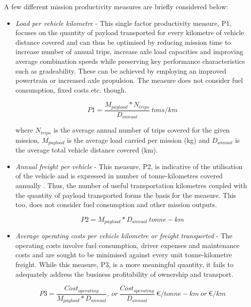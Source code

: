 \documentclass[ExampleMasters.tex]{subfiles}
\begin{document}
		A few different mission productivity measures are briefly considered below:
		\begin{itemize}
			\item \textit{Load per vehicle kilometre} - This single factor productivity measure, P1, focuses on the quantity of payload transported for every kilometre of vehicle distance covered and can thus be optimised by reducing mission time to increase number of annual trips, increase axle load capacities and improving average combination speeds while preserving key performance characteristics such as gradeability. These can be achieved by employing an improved powertrain or increased axle propulsion. The measure does not consider fuel consumption, fixed costs etc. though.

			\begin{equation}
				P1 = \frac{M_{payload}*N_{trips}}{D_{annual}} \ tons/km
			\end{equation}

			where $N_{trips}$ is the average annual number of trips covered for the given mission, $M_{payload}$ is the average load carried per mission (kg) and $D_{annual}$ is the average total vehicle distance covered (km).

			\item \textit{Annual freight per vehicle} - This measure, P2, is indicative of the utilisation of the vehicle and is expressed in number of tonne-kilometres covered annually \cite{TruckProdAus}. Thus, the number of useful transportation kilometres coupled with the quantity of payload transported forms the basis for the measure. This too, does not consider fuel consumption and other mission outputs.

			\begin{equation}
				P2 = M_{payload}*D_{annual} \ tonne-km
			\end{equation}

			\item \textit{Average operating costs per vehicle kilometre or freight transported} - The operating costs involve fuel consumption, driver expenses and maintenance costs and are sought to be minimised against every unit tonne-kilometre freight. While this measure, P3, is a more meaningful quantity, it fails to adequately address the business profitability of ownership and transport.

			\begin{equation}
				P3 = \frac{Cost_{operating}}{M_{payload}*D_{annual}},\ or\ \frac{Cost_{operating}}{D_{annual}} \  \euro/tonne-km \ or \ \euro/km 
			\end{equation}


\end{itemize}
\end{document}
